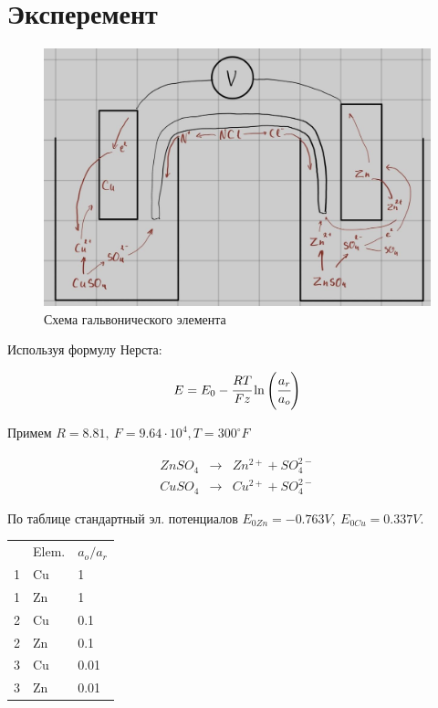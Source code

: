 \section{Эксперемент}

\begin{figure}[h]
    \centering
    \includegraphics[width=1\linewidth]{Ex_1/s.jpg}
     \caption{Схема гальвонического элемента}
    \label{ex_1_1}
\end{figure}

Используя формулу Нерста: 

\begin{equation}
  E = E_0 - \cfrac{RT}{Fz}\ln\left( \cfrac{a_{r}}{a_o} \right)  
\end{equation}

Примем $R = 8.81, \ F = 9.64\cdot10^4, T = 300^{\circ}F$

\begin{eqnarray}
  ZnSO_4 &\to& Zn^{2+} + SO_4^{2-} \\
  CuSO_4 &\to& Cu^{2+} + SO_4^{2-}
\end{eqnarray}

По таблице стандартный эл. потенциалов
 $E_{0Zn} = -0.763 V, \ E_{0Cu} = 0.337 V$.
  


 \begin{center}
     \begin{tabular}{l||l||l}
        & Elem. & $a_o/a_r$ \\
        1 & Cu & 1 \\
        1 & Zn & 1 \\
        2 & Cu & 0.1\\
        2 & Zn & 0.1\\   
        3 & Cu & 0.01\\   
        3 & Zn & 0.01\\   
      \end{tabular}
 \end{center}

